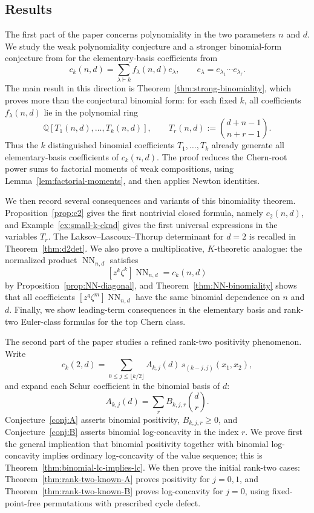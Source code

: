 \documentclass[11pt]{amsart}
\numberwithin{equation}{section}
\theoremstyle{remark}
\newcommand{\Q}{\mathbb Q}
\newcommand{\NN}{\operatorname{NN}}
\begin{document}
\subsection{Results} The first part of the paper concerns polynomiality in the two parameters
$n$ and $d$.  We study the weak polynomiality conjecture and a
stronger binomial-form conjecture from \cite{feher2025polynomiality} for the elementary-basis coefficients from 
\[
  c_k(n,d)=\sum_{\lambda\vdash k} f_\lambda(n,d)e_\lambda,
  \qquad e_\lambda=e_{\lambda_1}\cdots e_{\lambda_\ell}.
\]
The main result in this direction is Theorem~\ref{thm:strong-binomiality},
which proves more than the conjectural binomial form: for each fixed $k$,
all coefficients $f_\lambda(n,d)$ lie in the polynomial ring
\[
  \Q[T_1(n,d),\ldots,T_k(n,d)],
  \qquad
  T_r(n,d):=\binom{d+n-1}{n+r-1}.
\]
Thus the $k$ distinguished binomial coefficients $T_1,\ldots,T_k$
already generate all elementary-basis coefficients of $c_k(n,d)$.  The
proof reduces the Chern-root power sums to factorial moments of weak
compositions, using Lemma~\ref{lem:factorial-moments}, and then applies
Newton identities.

We then record several consequences and variants of this binomiality
theorem.  Proposition~\ref{prop:c2} gives the first nontrivial closed
formula, namely $c_2(n,d)$, and Example~\ref{ex:small-k-cknd} gives the
first universal expressions in the variables $T_r$.  The
Laksov--Lascoux--Thorup determinant for $d=2$ is recalled in
Theorem~\ref{thm:d2det}.  We also prove a multiplicative, $K$-theoretic
analogue: the normalized product $\NN_{n,d}$ satisfies
\[
  [z^k\zeta^k]\NN_{n,d}=c_k(n,d)
\]
by Proposition~\ref{prop:NN-diagonal}, and Theorem~\ref{thm:NN-binomiality}
shows that all coefficients $[z^q\zeta^m]\NN_{n,d}$ have the same
binomial dependence on $n$ and $d$.  Finally, we show leading-term
consequences in the elementary basis and rank-two Euler-class formulas for
the top Chern class.

The second part of the paper studies a refined rank-two positivity
phenomenon.  Write
\[
  c_k(2,d)
  =
  \sum_{0\le j\le \lfloor k/2\rfloor}
  A_{k,j}(d)\,s_{(k-j,j)}(x_1,x_2),
\]
and expand each Schur coefficient in the binomial basis of $d$:
\[
  A_{k,j}(d)=\sum_r B_{k,j,r}\binom dr.
\]
Conjecture~\ref{conj:A} asserts binomial positivity,
$B_{k,j,r}\ge0$, and Conjecture~\ref{conj:B} asserts binomial
log-concavity in the index $r$.  We prove first the general implication
that binomial positivity together with binomial log-concavity implies
ordinary log-concavity of the value sequence; this is
Theorem~\ref{thm:binomial-lc-implies-lc}.  We then prove the initial
rank-two cases: Theorem~\ref{thm:rank-two-known-A} proves positivity for
$j=0,1$, and Theorem~\ref{thm:rank-two-known-B} proves log-concavity for
$j=0$, using fixed-point-free permutations with prescribed cycle defect.
\end{document}
